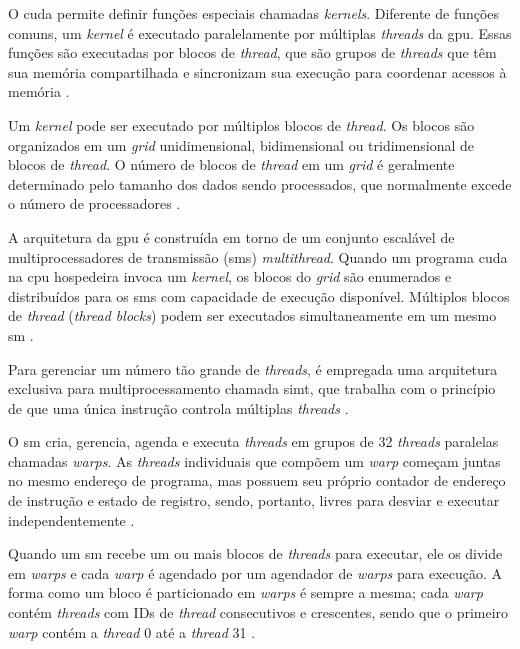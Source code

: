 O \gls{cuda} permite definir funções especiais chamadas \textit{kernels}. Diferente de funções comuns, um \textit{kernel} é executado paralelamente por múltiplas \textit{threads} da \gls{gpu}. Essas funções são executadas por blocos de \textit{thread}, que são grupos de \textit{threads} que têm sua memória compartilhada e sincronizam sua execução para coordenar acessos à memória \cite{guide2020cuda}.

Um \textit{kernel} pode ser executado por múltiplos blocos de \textit{thread}. Os blocos são organizados em um \textit{grid} unidimensional, bidimensional ou tridimensional de blocos de \textit{thread}. O número de blocos de \textit{thread} em um \textit{grid} é geralmente determinado pelo tamanho dos dados sendo processados, que normalmente excede o número de processadores \cite{guide2020cuda}.

A arquitetura da \gls{gpu} é construída em torno de um conjunto escalável de multiprocessadores de transmissão (\glspl{sm}) \textit{multithread}. Quando um programa \gls{cuda} na \gls{cpu} hospedeira invoca um \textit{kernel}, os blocos do \textit{grid} são enumerados e distribuídos para os \glspl{sm} com capacidade de execução disponível. Múltiplos blocos de \textit{thread} (\textit{thread blocks}) podem ser executados simultaneamente em um mesmo \gls{sm} \cite{guide2020cuda}.

Para gerenciar um número tão grande de \textit{threads}, é empregada uma arquitetura exclusiva para multiprocessamento chamada \gls{simt}, que trabalha com o princípio de que uma única instrução controla múltiplas \textit{threads} \cite{guide2020cuda}.

O \gls{sm} cria, gerencia, agenda e executa \textit{threads} em grupos de 32 \textit{threads} paralelas chamadas \textit{warps}. As \textit{threads} individuais que compõem um \textit{warp} começam juntas no mesmo endereço de programa, mas possuem seu próprio contador de endereço de instrução e estado de registro, sendo, portanto, livres para desviar e executar independentemente \cite{guide2020cuda}.

Quando um \gls{sm} recebe um ou mais blocos de \textit{threads} para executar, ele os divide em \textit{warps} e cada \textit{warp} é agendado por um agendador de \textit{warps} para execução. A forma como um bloco é particionado em \textit{warps} é sempre a mesma; cada \textit{warp} contém \textit{threads} com IDs de \textit{thread} consecutivos e crescentes, sendo que o primeiro \textit{warp} contém a \textit{thread} 0 até a \textit{thread} 31 \cite{guide2020cuda}.

